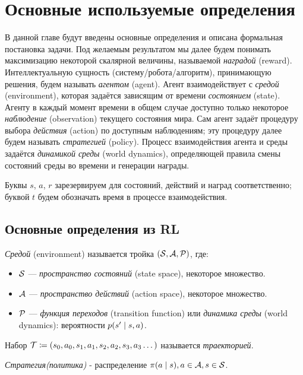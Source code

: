 \documentclass[../main.tex]{subfiles}
\begin{document}
\chapter{Основные используемые определения}


В данной главе будут введены основные определения и описана формальная постановка задачи. Под желаемым результатом мы далее будем понимать максимизацию некоторой скалярной величины, называемой \emph{наградой} (reward). Интеллектуальную сущность (систему/робота/алгоритм), принимающую решения, будем называть \emph{агентом} (agent). Агент взаимодействует с  \emph{средой} (environment), которая задаётся зависящим от времени \emph{состоянием} (state). Агенту в каждый момент времени в общем случае доступно только некоторое \emph{наблюдение} (observation) текущего состояния мира. Сам агент задаёт процедуру выбора \emph{действия} (action) по доступным наблюдениям; эту процедуру далее будем называть \emph{стратегией}  (policy). Процесс взаимодействия агента и среды задаётся \emph{динамикой среды} (world dynamics), определяющей правила смены состояний среды во времени и генерации награды.

Буквы $s$, $a$, $r$ зарезервируем для состояний, действий и наград соответственно; буквой $t$ будем обозначать время в процессе взаимодействия. 

\section{Основные определения из RL}



\emph{Средой} (environment) называется тройка $(\mathcal{S}, \mathcal{A}, \mathcal{P})$, где: 
\begin{itemize}
	\item $\mathcal{S}$ --- \emph{пространство состояний} (state space), некоторое множество.
	\item $\mathcal{A}$ --- \emph{пространство действий} (action space), некоторое множество.
	\item $\mathcal{P}$ --- \emph{функция переходов} (transition function) или \emph{динамика среды} (world dynamics): вероятности $p(s' \HM\mid s, a)$.
\end{itemize}

Набор $\mathcal{T} \coloneqq \left( s_0, a_0, s_1, a_1, s_2, a_2, s_3, a_3 \dots \right) $ называется \emph{траекторией}.


\emph{Стратегия(политика)} - распределение $\pi(a \mid s), a \HM\in \A, s \HM\in \St$.
\end{document}
